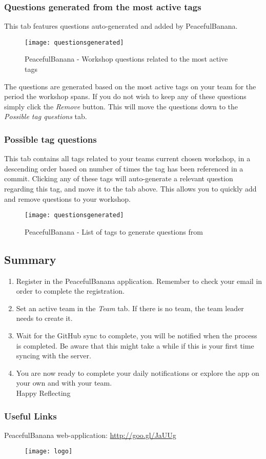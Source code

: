 \subsubsection*{Questions generated from the most active tags}
This tab features questions auto-generated and added by PeacefulBanana.
\begin{figure}[h!]
\label{questionsgenerated}
\centering
	\texttt{[image: questionsgenerated]}
\caption{PeacefulBanana - Workshop questions related to the most active tags}
\end{figure}

The questions are generated based on the most active tags on your team for the period the workshop spans. If you do not wish to keep any of these questions simply click the \textit{Remove} button. This will move the questions down to the \textit{Possible tag questions} tab.

\subsubsection*{Possible tag questions}
This tab contains all tags related to your teams current chosen workshop, in a descending order based on number of times the tag has been referenced in a commit. Clicking any of these tags will auto-generate a relevant question regarding this tag, and move it to the tab above. This allows you to quickly add and remove questions to your workshop. 
\begin{figure}[h!]
\label{questionsgenerated}
\centering
	\texttt{[image: questionsgenerated]}
\caption{PeacefulBanana - List of tags to generate questions from}
\end{figure}

\subsection{Summary}
\begin{enumerate}
\item Register in the PeacefulBanana application. Remember to check your email in order to complete the registration. 
\item Set an active team in the \textit{Team} tab. If there is no team, the team leader needs to create it. 
\item Wait for the GitHub sync to complete, you will be notified when the process is completed. Be aware that this might take a while if this is your first time syncing with the server.
\item You are now ready to complete your daily notifications or explore the app on your own and with your team. \\ Happy Reflecting
\end{enumerate}
\subsubsection*{Useful Links}
PeacefulBanana web-application: \url{http://goo.gl/JaUUg}
\begin{figure}[h!]
\label{logoappendix}
\centering
	\texttt{[image: logo]}
\end{figure}



